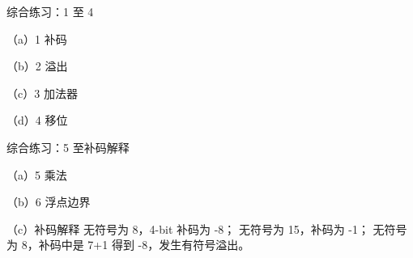 \begin{chapteranswer}{综合练习：1 至 4}
\begin{answersubproblem}{（a）1}
补码
\end{answersubproblem}
\begin{answersubproblem}{（b）2}
溢出
\end{answersubproblem}
\begin{answersubproblem}{（c）3}
加法器
\end{answersubproblem}
\begin{answersubproblem}{（d）4}
移位
\end{answersubproblem}
\end{chapteranswer}

\begin{chapteranswer}{综合练习：5 至补码解释}
\begin{answersubproblem}{（a）5}
乘法
\end{answersubproblem}
\begin{answersubproblem}{（b）6}
浮点边界
\end{answersubproblem}
\begin{answersubproblem}{（c）补码解释}
 无符号为 8，4-bit 补码为 -8； 无符号为 15，补码为 -1； 无符号为 8，补码中是 7+1 得到 -8，发生有符号溢出。
\end{answersubproblem}
\end{chapteranswer}

